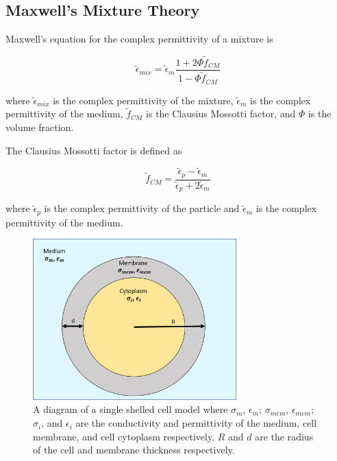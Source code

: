 \subsection{Maxwell's Mixture Theory}
 
 Maxwell's equation for the complex permittivity of a mixture is
  
  \begin{equation}
      \tilde{\epsilon}_{mix} = \tilde{\epsilon}_m\frac{1 + 2\Phi\tilde{f}_{CM}}{1-\Phi\tilde{f}_{CM}}
  \end{equation}
  
  \noindent where $\tilde{\epsilon}_{mix}$ is the complex permittivity of the mixture, $\tilde{\epsilon}_m$ is the complex permittivity of the medium, $\tilde{f}_{CM}$ is the Clausius Mossotti factor, and $\Phi$ is the volume fraction.
  
  \par The Clausius Mossotti factor is defined as 
  
  \begin{equation}
    \tilde{f}_{CM} = \frac{\tilde{\epsilon}_p - \tilde{\epsilon}_m}{\tilde{\epsilon}_p + 2\tilde{\epsilon}_m} 
  \end{equation}
  
  \noindent
  
  where $\tilde{\epsilon}_p$ is the complex permittivity of the particle and $\tilde{\epsilon}_m$ is the complex permittivity of the medium. 

 \begin{figure}[ht]
 \centering
 \includegraphics[width=0.7\textwidth]{images/singleShelledCell.png}
 \caption[Diagram of single shelled cell model.]{A diagram of a single shelled cell model where $\sigma_m$, $\epsilon_m$; $\sigma_{mem}$, $\epsilon_{mem}$; $\sigma_i$, and $\epsilon_i$ are the conductivity and permittivity of the medium, cell membrane, and cell cytoplasm respectively. $R$ and $d$ are the radius of the cell and membrane thickness respectively.}
 \label{fig:single_shell}
 \end{figure}

